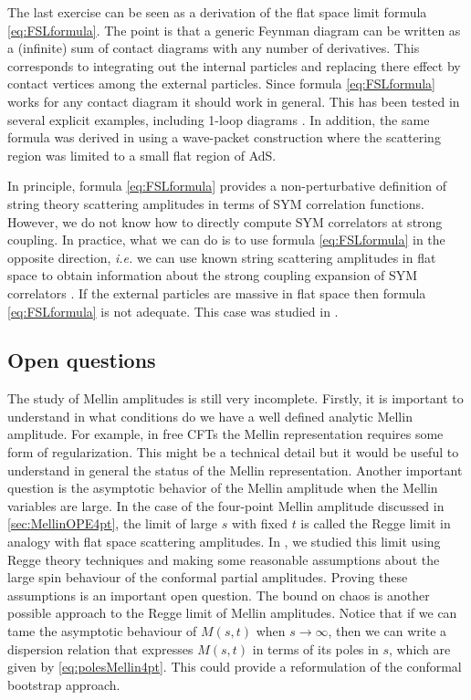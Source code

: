 \documentclass{ws-rv9x6}
\begin{document}
The last exercise can be seen as a derivation of the flat space limit formula \eqref{eq:FSLformula}. The point is that a generic Feynman diagram can be written as a (infinite) sum of contact diagrams with any number of derivatives. This corresponds to integrating out the internal particles and replacing there effect by contact vertices among the external particles. Since formula \eqref{eq:FSLformula} works for any contact diagram it should work in general.
This has been tested in several explicit examples, including 1-loop diagrams \cite{arXiv:1011.1485, arXiv:1107.1499, arXiv:1112.4845}. In addition, the same formula was derived in \cite{arXiv:1111.6972} using a wave-packet construction where the scattering region was limited to a small flat region of AdS.

In principle, formula \eqref{eq:FSLformula} provides a non-perturbative definition of string theory scattering amplitudes in terms of SYM correlation functions.
However, we do not know how to directly compute SYM correlators at strong coupling. In practice, what we can do is to use formula \eqref{eq:FSLformula} in the opposite direction, \emph{i.e.} we can use known string scattering amplitudes in flat space to obtain information about the strong coupling expansion of SYM correlators \cite{arXiv:1011.1485, arXiv:1411.1675}.
If the external  particles are massive in flat space then formula  \eqref{eq:FSLformula} is not adequate. This case was studied in \cite{Paulos:2016fap}.


\subsection{Open questions}

The study of Mellin amplitudes is still very incomplete.
Firstly, it is important to understand in what conditions do we have a well defined analytic Mellin amplitude. For example, in free CFTs the Mellin representation requires some form of regularization. This might be a  technical detail but it would be useful to understand in general the status of the Mellin representation.
Another important question is the asymptotic behavior of the Mellin amplitude when the Mellin variables are large. In the case of the four-point Mellin amplitude discussed in \ref{sec:MellinOPE4pt}, the limit of large $s$ with fixed $t$ is called the Regge limit in analogy with  flat space scattering amplitudes.
In \cite{arXiv:1209.4355}, we studied this limit using Regge theory techniques and making some reasonable assumptions about the large spin behaviour of the conformal partial amplitudes. Proving these assumptions is an important open question.
The bound on chaos \cite{Maldacena:2015waa} is another possible approach to the Regge limit of Mellin amplitudes.
Notice that if we can tame the asymptotic behaviour of $M(s,t)$ when $s\to \infty$, then we can write a dispersion relation that expresses $M(s,t)$ in terms of its poles in $s$, which are given by \eqref{eq:polesMellin4pt}.
This could provide a reformulation of the conformal bootstrap approach.
\end{document}
